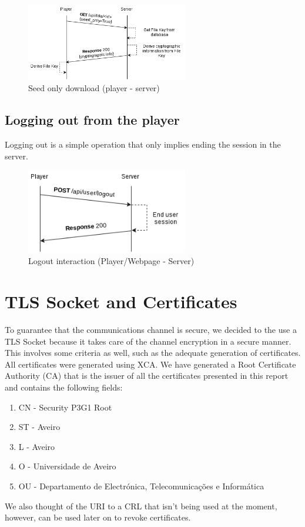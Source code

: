 \documentclass[11pt,a4paper]{report}
\begin{document}
\begin{figure}[H]
\centerline{\includegraphics[width=200pt]{images/seedOnlyDown.png}}
\caption{Seed only download (player - server)}
\label{player}
\end{figure}

\section{Logging out from the player}
Logging out is a simple operation that only implies ending the session in the server.

\begin{figure}[H]
\centerline{\includegraphics[width=200pt]{images/logout.png}}
\caption{Logout interaction (Player/Webpage - Server)}
\label{player}
\end{figure}

\chapter{TLS Socket and Certificates}
\label{sec:certs}
To guarantee that the communications channel is secure, we decided to the use a TLS Socket because it takes care of the channel encryption in a secure manner. This involves some criteria as well, such as the adequate generation of certificates.\\

All certificates were generated using XCA.
We have generated a Root Certificate Authority (CA) that is the issuer of all the certificates presented in this report and contains the following fields:
\begin{enumerate}
\item CN - Security P3G1 Root
\item ST - Aveiro
\item L - Aveiro
\item O - Universidade de Aveiro
\item OU - Departamento de Electrónica, Telecomunicações e Informática
\end{enumerate}
We also thought of the URI to a CRL that isn't being used at the moment, however, can be used later on to revoke certificates.
\end{document}
